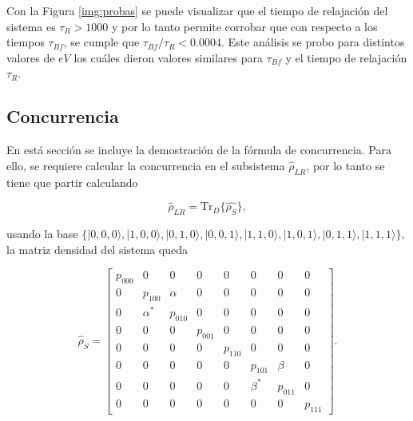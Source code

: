 \begin{appendixs}

Con la Figura \ref{img:probas} se puede visualizar que el tiempo de relajación del sistema es $\tau_{R}>1000$ y por lo tanto permite corrobar que con respecto a los tiempos $\tau_{Bf}$, se cumple que $\tau_{Bf}/\tau_{R} < 0.0004 $. Este análisis se probo para distintos valores de $eV$ los cuáles dieron valores similares para $\tau_{Bf}$ y el tiempo de relajación $\tau_{R}$. 

\label{appendix5tauf}

\newpage 

\subsection{Concurrencia}
En está sección se incluye la demostración de la fórmula de concurrencia. Para ello, se requiere calcular la concurrencia en el subsistema $\hat{\rho}_{LR}$, por lo tanto se tiene que partir calculando 

\begin{equation*}
    \hat{\rho}_{LR} = \text{Tr}_{D}\{ \hat{\rho_{S}} \},
\end{equation*}

usando la base $\{|0,0,0\rangle, |1,0,0\rangle, |0,1,0\rangle, |0,0,1\rangle, |1,1,0\rangle, |1,0,1\rangle, |0,1,1\rangle, |1,1,1\rangle\}$, la matriz densidad del sistema queda

\begin{equation}
    \hat{\rho}_{S} = 
    \begin{bmatrix}
        p_{000} & 0 & 0 & 0 & 0 & 0 & 0 & 0 \\
        0 & p_{100} & \alpha & 0 & 0 & 0 & 0 & 0 \\
        0 & \alpha^{*} & p_{010} & 0 & 0 & 0 & 0 & 0 \\
        0 & 0 & 0 & p_{001} & 0 & 0 & 0 & 0 \\
        0 & 0 & 0 & 0 & p_{110} & 0 & 0 & 0 \\
        0 & 0 & 0 & 0 & 0 & p_{101} & \beta & 0 \\
        0 & 0 & 0 & 0 & 0 & \beta^{*} & p_{011} & 0 \\
        0 & 0 & 0 & 0 & 0 & 0 & 0 & p_{111} 
        \end{bmatrix}.
        \label{appendix5rhoconcu}
\end{equation}


\end{appendixs}
